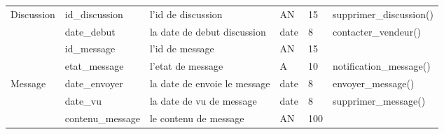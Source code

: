 \documentclass[edit,12pt,a4paper,ChapStyle,oneside,doubleinterligne]{report}
\begin{document}
\begin{table}[H]
\begin{tabular}{ | m{} | m{}| m{3cm} |m{}|m{}|l|}
                            Discussion  &id\_discussion&l'id de discussion&AN&15&supprimer\_discussion() \\\cline{2-6}
                                        &date\_debut&la date de debut discussion&date&8&contacter\_vendeur()\\\hline

                                        &id\_message&l'id de message&AN&15& \\\cline{2-6}
                                        &etat\_message&l'etat de message&A&10&notification\_message() \\\cline{2-6}
                              Message   &date\_envoyer&la date de envoie le message&date&8&envoyer\_message() \\\cline{2-6}
                                        &date\_vu&la date de vu de message&date&8&supprimer\_message() \\\cline{2-6}
                                        &contenu\_message&le contenu de message&AN&100& \\\hline


 \end{tabular}
\end{table}
\end{document}
